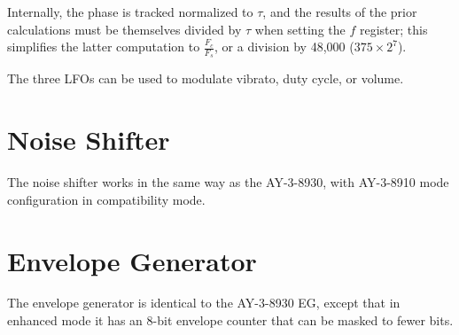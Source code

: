 Internally, the phase is tracked normalized to $\tau$, and the results of the prior calculations must be themselves divided by $\tau$ when setting the $f$ register; this simplifies the latter computation to $\frac{F_c}{F_s}$, or a division by 48,000 ($375 \times 2^7$).

The three LFOs can be used to modulate vibrato, duty cycle, or volume.

\section{Noise Shifter}

The noise shifter works in the same way as the AY-3-8930, with AY-3-8910 mode configuration in compatibility mode.

\section{Envelope Generator}

The envelope generator is identical to the AY-3-8930 EG, except that in enhanced mode it has an 8-bit envelope counter that can be masked to fewer bits.